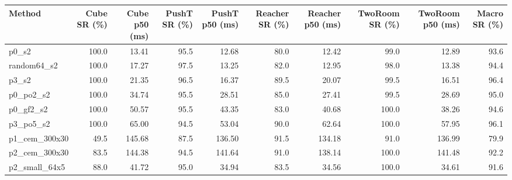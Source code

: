 \begin{tabular}{lrrrrrrrrr}
\toprule
Method & Cube SR (\%) & Cube p50 (ms) & PushT SR (\%) & PushT p50 (ms) & Reacher SR (\%) & Reacher p50 (ms) & TwoRoom SR (\%) & TwoRoom p50 (ms) & Macro SR (\%) \\
\midrule
p0\_s2 & 100.0 & 13.41 & 95.5 & 12.68 & 80.0 & 12.42 & 99.0 & 12.89 & 93.6 \\
random64\_s2 & 100.0 & 17.27 & 97.5 & 13.25 & 82.0 & 12.95 & 98.0 & 13.38 & 94.4 \\
p3\_s2 & 100.0 & 21.35 & 96.5 & 16.37 & 89.5 & 20.07 & 99.5 & 16.51 & 96.4 \\
p0\_po2\_s2 & 100.0 & 34.74 & 95.5 & 28.51 & 85.0 & 27.41 & 99.5 & 28.69 & 95.0 \\
p0\_gf2\_s2 & 100.0 & 50.57 & 95.5 & 43.35 & 83.0 & 40.68 & 100.0 & 38.26 & 94.6 \\
p3\_po5\_s2 & 100.0 & 65.00 & 94.5 & 53.04 & 90.0 & 62.64 & 100.0 & 57.95 & 96.1 \\
p1\_cem\_300x30 & 49.5 & 145.68 & 87.5 & 136.50 & 91.5 & 134.18 & 91.0 & 136.99 & 79.9 \\
p2\_cem\_300x30 & 83.5 & 144.38 & 94.5 & 141.64 & 91.0 & 138.14 & 100.0 & 141.48 & 92.2 \\
p2\_small\_64x5 & 88.0 & 41.72 & 95.0 & 34.94 & 83.5 & 34.56 & 100.0 & 34.61 & 91.6 \\
\bottomrule
\end{tabular}
